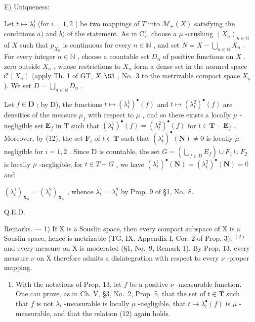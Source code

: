 E) Uniqueness:

Let \(t \mapsto \lambda_t^i\) (for \(i = 1,2\) ) be two mappings of \(T\) into \(\mathcal{M}_+(X)\) satisfying the conditions \(a)\) and \(b)\) of the statement. As in C), choose a \(\mu\) -crushing \((X_n)_{n \in \mathbb{N}}\) of \(X\) such that \(p_{X_n}\) is continuous for every \(n \in \mathbb{N}\) , and set \(N = X - \bigcup_{n \in \mathbb{N}} X_n\) . For every integer \(n \in \mathbb{N}\) , choose a countable set \(D_n\) of positive functions on \(X\) , zero outside \(X_n\) , whose restrictions to \(X_n\) form a dense set in the normed space \(\mathcal{C}(X_n)\) (apply Th. 1 of GT, \(X, \S 3\) , No.~3 to the metrizable compact space \(X_n\) ). We set \(D = \bigcup_{n \in \mathbb{N}} D_n\) .

Let \(f \in \mathbf{D}\) ; by D), the functions \(t \mapsto (\lambda_t^1)^{\bullet}(f)\) and \(t \mapsto (\lambda_t^2)^{\bullet}(f)\) are densities of the measure \(\mu_f\) with respect to \(\mu\) , and so there exists a locally \(\mu\) -negligible set \(\mathbf{E}_f\) in T such that \((\lambda_t^1)^{\bullet}(f) = (\lambda_t^2)^{\bullet}(f)\) for \(t \in \mathbf{T} - \mathbf{E}_f\) . Moreover, by (12), the set \(\mathbf{F}_i\) of \(t \in \mathbf{T}\) such that \((\lambda_t^i)^{\bullet}(\mathbf{N}) \neq 0\) is locally \(\mu\) -negligible for \(i = 1, 2\) . Since D is countable, the set \(G = \left( \bigcup_{f \in D} E_f \right) \cup F_1 \cup F_2\) is locally \(\mu\) -negligible; for \(t \in T - G\) , we have \((\lambda_t^1)^{\bullet}(\mathbf{N}) = (\lambda_t^2)^{\bullet}(\mathbf{N}) = 0\) and

\((\lambda_t^1)_{\mathbf{X}_n} = (\lambda_t^2)_{\mathbf{X}_n}\) , whence \(\lambda_t^1 = \lambda_t^2\) by Prop. 9 of §1, No.~8.

Q.E.D.

Remarks. --- 1) If X is a Souslin space, then every compact subspace of X is a Souslin space, hence is metrizable (TG, IX, Appendix I, Cor. 2 of Prop. 3), \(^{(2)}\) and every measure on X is moderated (§1, No.~9, Remark 1). By Prop. 13, every measure \(\nu\) on X therefore admits a disintegration with respect to every \(\nu\) -proper mapping.

\begin{enumerate}
\def\labelenumi{\arabic{enumi})}
\setcounter{enumi}{1}
\tightlist
\item
  With the notations of Prop. 13, let \(f\) be a positive \(\nu\) -measurable function. One can prove, as in Ch. V, §3, No.~2, Prop. 5, that the set of \(t \in \mathbf{T}\) such that \(f\) is not \(\lambda_t\) -measurable is locally \(\mu\) -negligible, that \(t \mapsto \lambda_t^\bullet(f)\) is \(\mu\) -measurable, and that the relation (12) again holds.
\end{enumerate}

